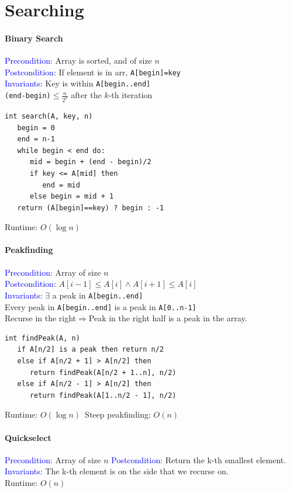 \section{Searching}
\paragraph{Binary Search}
\textcolor{Blue}{Precondition}: Array is sorted, and of size $n$\\
\textcolor{Blue}{Postcondition}: If element is in arr, \verb|A[begin]=key|\\
\textcolor{Blue}{Invariants}: Key is within \verb|A[begin..end]|\\
\verb|(end-begin)|$\le \frac{n}{2^k}$ after the $k$-th iteration
\begin{verbatim}
int search(A, key, n)
   begin = 0
   end = n-1
   while begin < end do:
      mid = begin + (end - begin)/2
      if key <= A[mid] then
         end = mid
      else begin = mid + 1
   return (A[begin]==key) ? begin : -1
\end{verbatim}
\textcolor{Bittersweet}{Runtime}: $O(\log n)$

\paragraph{Peakfinding}
\textcolor{Blue}{Precondition}: Array of size $n$\\
\textcolor{Blue}{Postcondition}: $A[i-1]\le A[i]\wedge A[i+1]\le A[i]$\\
\textcolor{Blue}{Invariants}: $\exists$ a peak in \verb|A[begin..end]|\\
Every peak in \verb|A[begin..end]| is a peak in \verb|A[0..n-1]|\\
Recurse in the right$\Rightarrow$Peak in the right half is a peak in the array.
\begin{verbatim}
int findPeak(A, n)
   if A[n/2] is a peak then return n/2
   else if A[n/2 + 1] > A[n/2] then
      return findPeak(A[n/2 + 1..n], n/2)
   else if A[n/2 - 1] > A[n/2] then
      return findPeak(A[1..n/2 - 1], n/2)
\end{verbatim}
\textcolor{Bittersweet}{Runtime}: $O(\log n)$\ \textcolor{Bittersweet}{Steep peakfinding}: $O(n)$

\paragraph{Quickselect}
\textcolor{Blue}{Precondition}: Array of size $n$
\textcolor{Blue}{Postcondition}: Return the k-th smallest element.
\textcolor{Blue}{Invariants}: The k-th element is on the side that we recurse on.\\
\textcolor{Bittersweet}{Runtime}: $O(n)$
